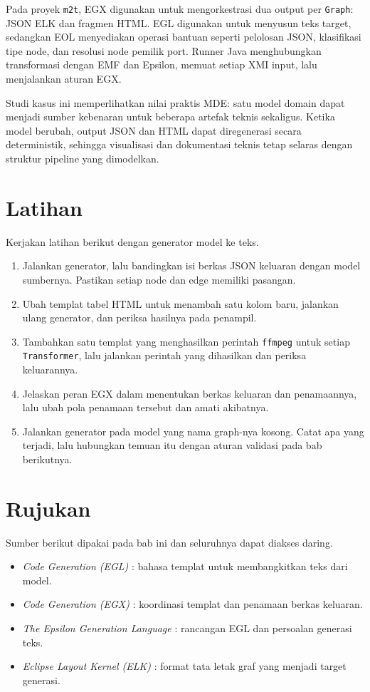 Pada proyek \texttt{m2t}, EGX digunakan untuk mengorkestrasi dua output per \texttt{Graph}: JSON ELK dan fragmen HTML. EGL digunakan untuk menyusun teks target, sedangkan EOL menyediakan operasi bantuan seperti pelolosan JSON, klasifikasi tipe node, dan resolusi node pemilik port. Runner Java menghubungkan transformasi dengan EMF dan Epsilon, memuat setiap XMI input, lalu menjalankan aturan EGX.

Studi kasus ini memperlihatkan nilai praktis MDE: satu model domain dapat menjadi sumber kebenaran untuk beberapa artefak teknis sekaligus. Ketika model berubah, output JSON dan HTML dapat diregenerasi secara deterministik, sehingga visualisasi dan dokumentasi teknis tetap selaras dengan struktur pipeline yang dimodelkan.

\section{Latihan}

Kerjakan latihan berikut dengan generator model ke teks.

\begin{enumerate}
  \item Jalankan generator, lalu bandingkan isi berkas JSON keluaran dengan model sumbernya. Pastikan setiap node dan edge memiliki pasangan.
  \item Ubah templat tabel HTML untuk menambah satu kolom baru, jalankan ulang generator, dan periksa hasilnya pada penampil.
  \item Tambahkan satu templat yang menghasilkan perintah \texttt{ffmpeg} untuk setiap \texttt{Transformer}, lalu jalankan perintah yang dihasilkan dan periksa keluarannya.
  \item Jelaskan peran EGX dalam menentukan berkas keluaran dan penamaannya, lalu ubah pola penamaan tersebut dan amati akibatnya.
  \item Jalankan generator pada model yang nama graph-nya kosong. Catat apa yang terjadi, lalu hubungkan temuan itu dengan aturan validasi pada bab berikutnya.
\end{enumerate}

\section{Rujukan}

Sumber berikut dipakai pada bab ini dan seluruhnya dapat diakses daring.

\begin{itemize}
  \item \textit{Code Generation (EGL)} \cite{doc-egl}: bahasa templat untuk membangkitkan teks dari model.
  \item \textit{Code Generation (EGX)} \cite{doc-egx}: koordinasi templat dan penamaan berkas keluaran.
  \item \textit{The Epsilon Generation Language} \cite{rose2008egl}: rancangan EGL dan persoalan generasi teks.
  \item \textit{Eclipse Layout Kernel (ELK)} \cite{doc-elk}: format tata letak graf yang menjadi target generasi.
\end{itemize}
